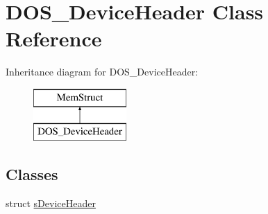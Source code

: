 \hypertarget{classDOS__DeviceHeader}{\section{D\-O\-S\-\_\-\-Device\-Header Class Reference}
\label{classDOS__DeviceHeader}
}
Inheritance diagram for D\-O\-S\-\_\-\-Device\-Header\-:\begin{figure}[H]
\begin{center}
\leavevmode
\includegraphics[height=2.000000cm]{classDOS__DeviceHeader}
\end{center}
\end{figure}
\subsection*{Classes}
\begin{DoxyCompactItemize}
\item 
struct \hyperlink{structDOS__DeviceHeader_1_1sDeviceHeader}{s\-Device\-Header}
\end{DoxyCompactItemize}
